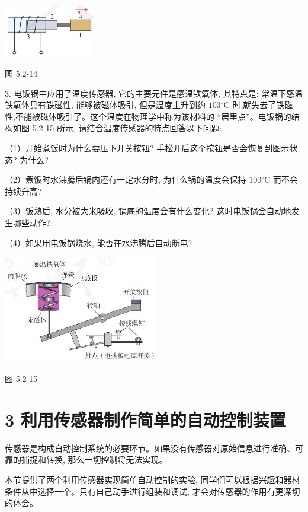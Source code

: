 \documentclass[10pt]{article}
\begin{document}
\begin{center}
\includegraphics[max width=0.3\textwidth]{images/01910e72-c5b7-7ed5-a6d4-fb3a5faefc32_107_822489.jpg}
\end{center}

图 5.2-14

3. 电饭锅中应用了温度传感器, 它的主要元件是感温铁氧体, 其特点是: 常温下感温铁氧体具有铁磁性, 能够被磁体吸引, 但是温度上升到约 \({103}{}^{ \circ }\mathrm{C}\) 时,就失去了铁磁性,不能被磁体吸引了。这个温度在物理学中称为该材料的 “居里点”。电饭锅的结构如图 5.2-15 所示, 请结合温度传感器的特点回答以下问题:

（1）开始煮饭时为什么要压下开关按钮? 手松开后这个按钮是否会恢复到图示状态? 为什么?

（2）煮饭时水沸腾后锅内还有一定水分时, 为什么锅的温度会保持 \({100}^{ \circ }\mathrm{C}\) 而不会持续升高?

（3）饭熟后, 水分被大米吸收, 锅底的温度会有什么变化? 这时电饭锅会自动地发生哪些动作?

（4）如果用电饭锅烧水, 能否在水沸腾后自动断电?

\begin{center}
\includegraphics[max width=0.5\textwidth]{images/01910e72-c5b7-7ed5-a6d4-fb3a5faefc32_107_254773.jpg}
\end{center}

图 5.2-15

\section*{3 利用传感器制作简单的自动控制装置}

传感器是构成自动控制系统的必要环节。如果没有传感器对原始信息进行准确、可靠的捕捉和转换, 那么一切控制将无法实现。

本节提供了两个利用传感器实现简单自动控制的实验, 同学们可以根据兴趣和器材条件从中选择一个。只有自己动手进行组装和调试, 才会对传感器的作用有更深切的体会。
\end{document}
